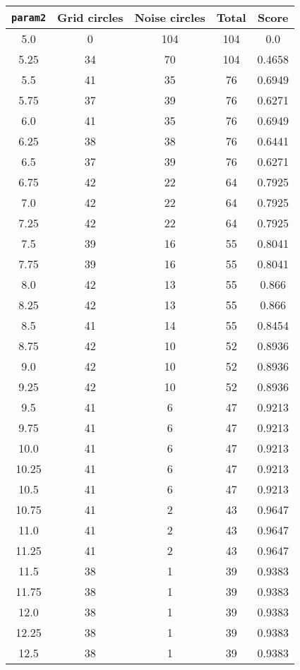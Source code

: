 \documentclass[letterpaper, 12pt]{article}
\begin{document}
\begin{longtable}{|c|c|c|c|c|}
\hline
\textbf{\texttt{param2}} & \textbf{Grid circles} & \textbf{Noise circles} & \textbf{Total} & \textbf{Score} \\
\hline
5.0 & 0 & 104 & 104 & 0.0 \\
\hline
5.25 & 34 & 70 & 104 & 0.4658 \\
\hline
5.5 & 41 & 35 & 76 & 0.6949 \\
\hline
5.75 & 37 & 39 & 76 & 0.6271 \\
\hline
6.0 & 41 & 35 & 76 & 0.6949 \\
\hline
6.25 & 38 & 38 & 76 & 0.6441 \\
\hline
6.5 & 37 & 39 & 76 & 0.6271 \\
\hline
6.75 & 42 & 22 & 64 & 0.7925 \\
\hline
7.0 & 42 & 22 & 64 & 0.7925 \\
\hline
7.25 & 42 & 22 & 64 & 0.7925 \\
\hline
7.5 & 39 & 16 & 55 & 0.8041 \\
\hline
7.75 & 39 & 16 & 55 & 0.8041 \\
\hline
8.0 & 42 & 13 & 55 & 0.866 \\
\hline
8.25 & 42 & 13 & 55 & 0.866 \\
\hline
8.5 & 41 & 14 & 55 & 0.8454 \\
\hline
8.75 & 42 & 10 & 52 & 0.8936 \\
\hline
9.0 & 42 & 10 & 52 & 0.8936 \\
\hline
9.25 & 42 & 10 & 52 & 0.8936 \\
\hline
9.5 & 41 & 6 & 47 & 0.9213 \\
\hline
9.75 & 41 & 6 & 47 & 0.9213 \\
\hline
10.0 & 41 & 6 & 47 & 0.9213 \\
\hline
10.25 & 41 & 6 & 47 & 0.9213 \\
\hline
10.5 & 41 & 6 & 47 & 0.9213 \\
\hline
10.75 & 41 & 2 & 43 & 0.9647 \\
\hline
11.0 & 41 & 2 & 43 & 0.9647 \\
\hline
11.25 & 41 & 2 & 43 & 0.9647 \\
\hline
11.5 & 38 & 1 & 39 & 0.9383 \\
\hline
11.75 & 38 & 1 & 39 & 0.9383 \\
\hline
12.0 & 38 & 1 & 39 & 0.9383 \\
\hline
12.25 & 38 & 1 & 39 & 0.9383 \\
\hline
12.5 & 38 & 1 & 39 & 0.9383 \\

\end{longtable}
\end{document}
